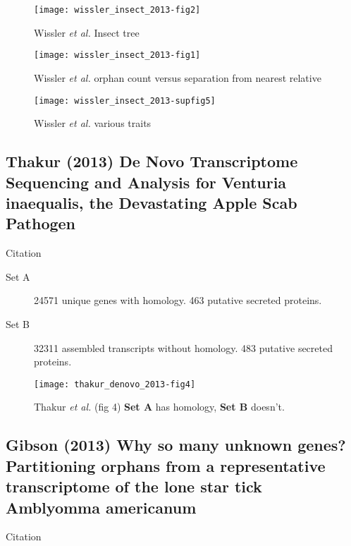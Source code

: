     \begin{figure}[!ht] \centering
        \texttt{[image: wissler\_insect\_2013-fig2]} \caption{
            Wissler \textit{et al.} Insect tree } \end{figure}

    \begin{figure}[!ht] \centering
        \texttt{[image: wissler\_insect\_2013-fig1]} \caption{
            Wissler \textit{et al.} orphan count versus separation from
        nearest relative } \end{figure}

    \begin{figure}[!ht] \centering
        \texttt{[image: wissler\_insect\_2013-supfig5]} \caption{
            Wissler \textit{et al.} various traits } \end{figure}

    \FloatBarrier

\subsection{Thakur (2013) De Novo Transcriptome Sequencing and Analysis for
Venturia inaequalis, the Devastating Apple Scab Pathogen}

    Citation \cite{thakur_novo_2013}

    \begin{description}
        \item[Set A] 24571 unique genes with homology. 463 putative secreted
            proteins.
        \item[Set B] 32311 assembled transcripts without homology. 483 putative
            secreted proteins.
    \end{description}

    \begin{figure}[!ht] \centering
        \texttt{[image: thakur\_denovo\_2013-fig4]}
        \caption{
            Thakur \textit{et al.} (fig 4) \textbf{Set A} has homology,
            \textbf{Set B} doesn't.
        }
    \end{figure}
    \FloatBarrier

\subsection{Gibson (2013) Why so many unknown genes? Partitioning orphans
from a representative transcriptome of the lone star tick Amblyomma
americanum}

    Citation \cite{gibson_why_2013}

